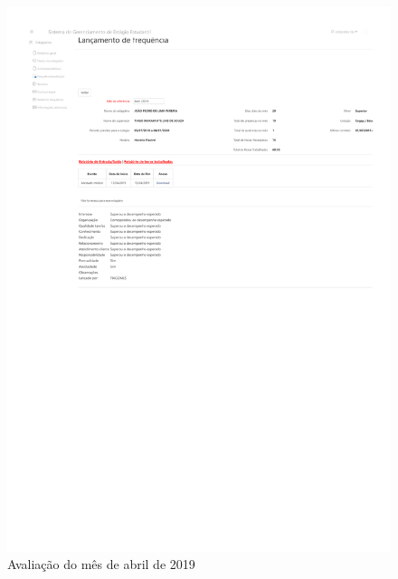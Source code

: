 \begin{anexosenv}
\begin{figure}
    \centering
    \includegraphics[trim=100 410 0 140, clip, width=\textwidth]{anexos/avaliacao201904}
    \caption{Avaliação do mês de abril de 2019}
    \label{fig:avaliacao201904}
\end{figure}


\end{anexosenv}
